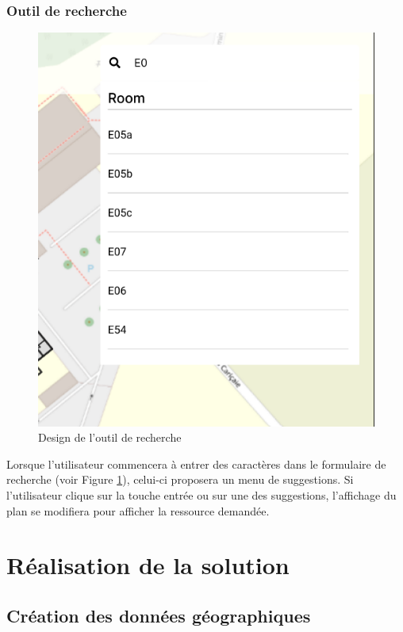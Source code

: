 \documentclass[
    iai, %
    il, %
]{heig-tb}
\begin{document}
\subsection{Outil de recherche}

\begin{figure}[h]
    \centering
    \includegraphics[scale=0.3]{designRecherche.png}
    \caption{Design de l'outil de recherche}
    \label{fig:searchBar}
\end{figure}

Lorsque l'utilisateur commencera à entrer des caractères dans le formulaire de recherche (voir Figure \ref{fig:searchBar}), celui-ci proposera un menu de suggestions.
Si l'utilisateur clique sur la touche entrée ou sur une des suggestions, l'affichage du plan se modifiera pour afficher la ressource demandée.


\chapter{Réalisation de la solution}

\section{Création des données géographiques}
\end{document}

